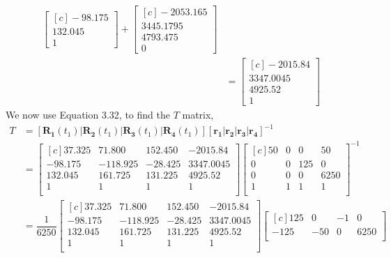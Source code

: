 \documentclass[onecolumn,10pt]{jhwhw}
\begin{document}
\begin{align*}
\begin{bmatrix*}[c]
-98.175 \\
132.045 \\
1 
\end{bmatrix*}
+
\begin{bmatrix*}[c]
-2053.165 \\
3445.1795 \\
4793.475 \\
0
\end{bmatrix*} \\
&=
\begin{bmatrix*}[c]
-2015.84 \\
3347.0045 \\
4925.52 \\
1 
\end{bmatrix*}
\end{align*} 
We now use Equation 3.32, to find the $T$ matrix,
\begin{align*}
T &= \left [ \bm{R_1}(t_1) | \bm{R_2}(t_1) | \bm{R_3}(t_1) | \bm{R_4}(t_1) \right ] \left [ \bm{r_1} | \bm{r_2} | \bm{r_3} | \bm{r_4} \right ]^{-1} \\
&=
\begin{bmatrix*}[c]
37.325  & 71.800   & 152.450 & -2015.84  \\
-98.175 & -118.925 & -28.425 & 3347.0045 \\
132.045 & 161.725  & 131.225 & 4925.52   \\
1       & 1        & 1       & 1         \\
\end{bmatrix*}
\begin{bmatrix*}[c]
50 & 0 & 0   & 50   \\
0  & 0 & 125 & 0    \\
0  & 0 & 0   & 6250 \\
1  & 1 & 1   & 1    \\
\end{bmatrix*}^{-1} \\
&=
\dfrac{1}{6250}
\begin{bmatrix*}[c]
37.325  & 71.800   & 152.450 & -2015.84  \\
-98.175 & -118.925 & -28.425 & 3347.0045 \\
132.045 & 161.725  & 131.225 & 4925.52   \\
1       & 1        & 1       & 1         \\
\end{bmatrix*}
\begin{bmatrix*}[c]
125  & 0   & -1 & 0    \\
-125 & -50 & 0  & 6250 \\

\end{bmatrix*}
\end{align*}
\end{document}

